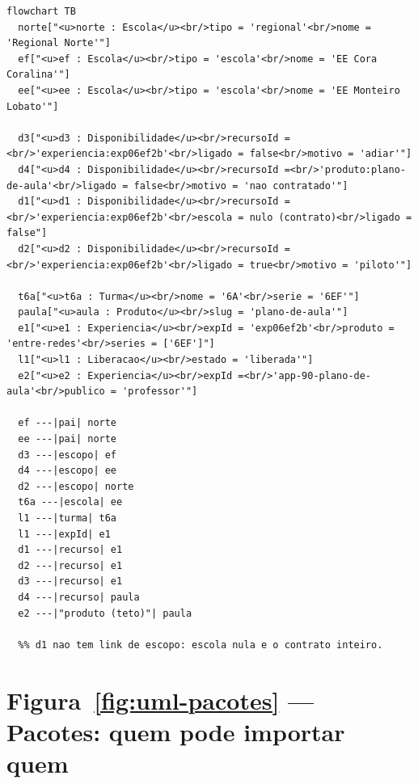 \begin{lstlisting}[language=mermaid]
%% aproximacao: o Mermaid nao tem diagrama de objetos; cada instancia vira um no com os valores dos slots, o nome sublinhado vira a tag u do HTML, e cada link vira aresta rotulada com o papel.
flowchart TB
  norte["<u>norte : Escola</u><br/>tipo = 'regional'<br/>nome = 'Regional Norte'"]
  ef["<u>ef : Escola</u><br/>tipo = 'escola'<br/>nome = 'EE Cora Coralina'"]
  ee["<u>ee : Escola</u><br/>tipo = 'escola'<br/>nome = 'EE Monteiro Lobato'"]

  d3["<u>d3 : Disponibilidade</u><br/>recursoId =<br/>'experiencia:exp06ef2b'<br/>ligado = false<br/>motivo = 'adiar'"]
  d4["<u>d4 : Disponibilidade</u><br/>recursoId =<br/>'produto:plano-de-aula'<br/>ligado = false<br/>motivo = 'nao contratado'"]
  d1["<u>d1 : Disponibilidade</u><br/>recursoId =<br/>'experiencia:exp06ef2b'<br/>escola = nulo (contrato)<br/>ligado = false"]
  d2["<u>d2 : Disponibilidade</u><br/>recursoId =<br/>'experiencia:exp06ef2b'<br/>ligado = true<br/>motivo = 'piloto'"]

  t6a["<u>t6a : Turma</u><br/>nome = '6A'<br/>serie = '6EF'"]
  paula["<u>aula : Produto</u><br/>slug = 'plano-de-aula'"]
  e1["<u>e1 : Experiencia</u><br/>expId = 'exp06ef2b'<br/>produto = 'entre-redes'<br/>series = ['6EF']"]
  l1["<u>l1 : Liberacao</u><br/>estado = 'liberada'"]
  e2["<u>e2 : Experiencia</u><br/>expId =<br/>'app-90-plano-de-aula'<br/>publico = 'professor'"]

  ef ---|pai| norte
  ee ---|pai| norte
  d3 ---|escopo| ef
  d4 ---|escopo| ee
  d2 ---|escopo| norte
  t6a ---|escola| ee
  l1 ---|turma| t6a
  l1 ---|expId| e1
  d1 ---|recurso| e1
  d2 ---|recurso| e1
  d3 ---|recurso| e1
  d4 ---|recurso| paula
  e2 ---|"produto (teto)"| paula

  %% d1 nao tem link de escopo: escola nula e o contrato inteiro.
\end{lstlisting}

\section{Figura~\ref{fig:uml-pacotes} --- Pacotes: quem pode importar quem}

